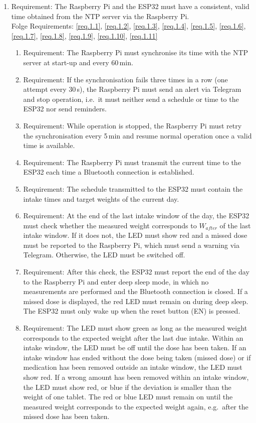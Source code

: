 	\begin{enumerate}[label*=\arabic*.]
		\item \label{req.1} Requirement: The Raspberry Pi and the ESP32 must have a consistent, valid time obtained from the NTP server via the Raspberry Pi. \\
		Folge Requirements: \ref{req.1.1}, \ref{req.1.2}, \ref{req.1.3}, \ref{req.1.4}, \ref{req.1.5}, \ref{req.1.6}, \ref{req.1.7}, \ref{req.1.8}, \ref{req.1.9}, \ref{req.1.10}, \ref{req.1.11}
		\begin{enumerate}[label*=\arabic*.]
			\item \label{req.1.1} Requirement: The Raspberry Pi must synchronise its time with the NTP server at start-up and every 60\,min.
			\item \label{req.1.2} Requirement: If the synchronisation fails three times in a row (one attempt every 30\,s), the Raspberry Pi must send an
			alert via Telegram and stop operation, i.e.\ it must neither send a schedule or time to the ESP32 nor send
			reminders.
			\item \label{req.1.3} Requirement: While operation is stopped, the Raspberry Pi must retry the synchronisation every 5\,min and resume normal
			operation once a valid time is available.
			\item \label{req.1.4} Requirement: The Raspberry Pi must transmit the current time to the ESP32 each time a Bluetooth connection is established.
			\item \label{req.1.5} Requirement: The schedule transmitted to the ESP32 must contain the intake times and target weights of the current day.
			\item \label{req.1.6} Requirement: At the end of the last intake window of the day, the ESP32 must check whether the measured weight corresponds to $W_{after}$ of the last intake window. If it does not, the LED must show red and a missed dose must be reported to the Raspberry Pi, which must send a warning via Telegram. Otherwise, the LED must be switched off.
			\item \label{req.1.7} Requirement: After this check, the ESP32 must report the end of the day to the Raspberry Pi and enter deep sleep mode, in which no measurements are performed and the Bluetooth connection is closed. If a missed dose is displayed, the red LED must remain on during deep sleep. The ESP32 must only wake up when the reset button (EN) is pressed.
			\item \label{req.1.8} Requirement: The LED must show green as long as the measured weight corresponds to the expected weight after the last due intake. Within an intake window, the LED must be off until the dose has been taken. If an intake window has ended without the dose being taken (missed dose) or if medication has been removed outside an intake window, the LED must show red. If a wrong amount has been removed within an intake window, the LED must show red, or blue if the deviation is smaller than the weight of one tablet. The red or blue LED must remain on until the measured weight corresponds to the expected weight again, e.g.\ after the missed dose has been taken.

\end{enumerate}
\end{enumerate}
